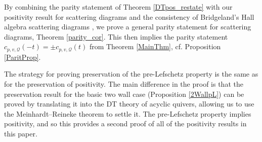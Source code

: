\documentclass{amsart}
\newcommand {\sQ} {\mathcal{Q}}
\theoremstyle{plain}%
\theoremstyle{definition}
\theoremstyle{remark}
\begin{document}
By combining the parity statement of Theorem \ref{DTpos_restate} with our positivity result for scattering diagrams and the consistency of Bridgeland's Hall algebra scattering diagrams \cite{Bridge}, we prove a general parity statement for scattering diagrams, Theorem \ref{parity_cor}.  This then implies the parity statement $c_{p,v,\sQ}(-t)=\pm c_{p,v,\sQ}(t)$ from Theorem \ref{MainThm}, cf. Proposition \ref{ParitProp}.

The strategy for proving preservation of the pre-Lefschetz property is the same as for the preservation of positivity.  The main difference in the proof is that the preservation result for the basic two wall case (Proposition \ref{2WallpL}) can be proved by translating it into the DT theory of acyclic quivers, allowing us to use the Meinhardt--Reineke theorem to settle it.  The pre-Lefschetz property implies positivity, and so this provides a second proof of all of the positivity results in this paper. 
\end{document}
